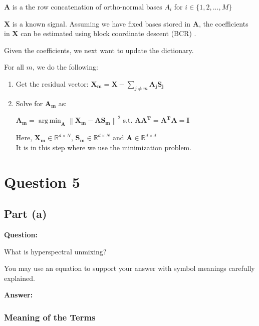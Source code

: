 \documentclass[fleqn, 11pt]{article}
\DeclareMathOperator*{\argmin}{arg\,min}
\newcommand{\bs}[1]{\boldsymbol{#1}}
\newcommand\norm[1]{\left\lVert#1\right\rVert}
\newcommand{\R}[0]{\mathbb{R}}
\begin{document}
\smallskip

$\bs{A}$ is a the row concatenation of ortho-normal bases $A_i$ for $i \in \{ 1,2,...,M \}$

\smallskip

$\bs{X}$ is a known signal. Assuming we have fixed bases stored in $\bs{A}$, the
coefficients in $\bs{X}$ can be estimated using block
coordinate descent (BCR) . 

\smallskip

Given the coefficients, we next want to update
the dictionary. 

\medskip

For all $m$, we do the following: 
\begin{enumerate}
    \item Get the residual vector: $\bs{ X_m = X} - \displaystyle  \sum_{j \neq m} \bs{A_j S_j }$
    \item Solve for $\bs{A_m}$ as: 
    \begin{center}
            $\bs{A_m} = \argmin_{\bs{A}} \norm{\bs{X_m-AS_m}}^2$ s.t. $\bs{AA^T=A^TA=I}$
    \end{center}
    Here, $\bs{X_m} \in \R^{d \times N}$, $\bs{S_m} \in \R^{d \times N} $ and  $\bs{A} \in \R^{d \times d} $ \\
    It is in this step where we use the minimization problem. 
\end{enumerate}


\newpage


\section*{Question 5}
\setcounter{equation}{0}


\subsection*{Part (a)}

\textbf{Question: }

\smallskip

What is hyperspectral unmixing? 

You may use an equation to support your answer with symbol
meanings carefully explained.

\hrulefill

\medskip

\textbf{Answer: }
\subsubsection*{Meaning of the Terms}
\end{document}
